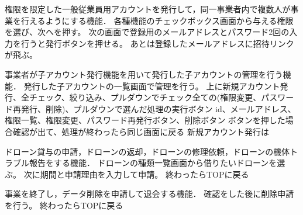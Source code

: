 \documentclass[a4paper, titlepage]{jsarticle}
\begin{document}
\begin{description}[labelwidth=\linewidth]
  \item [子アカウント発行機能] 権限を限定した一般従業員用アカウントを発行して，同一事業者内で複数人が事業を行えるようにする機能．
  各種機能のチェックボックス画面から与える権限を選び、次へを押す。
  次の画面で登録用のメールアドレスとパスワード2回の入力を行うと発行ボタンを押せる。
  あとは登録したメールアドレスに招待リンクが飛ぶ。

  \item [子アカウント管理機能] 事業者が子アカウント発行機能を用いて発行した子アカウントの管理を行う機能．
  発行した子アカウントの一覧画面で管理を行う。
  上に新規アカウント発行、全チェック、絞り込み、プルダウンでチェック全ての(権限変更、パスワード再発行、削除)、プルダウンで選んだ処理の実行ボタン
  id、メールアドレス、権限一覧、権限変更、パスワード再発行ボタン、削除ボタン
  ボタンを押した場合確認が出て、処理が終わったら同じ画面に戻る
  新規アカウント発行は

  \item [ドローン貸与申請機能] ドローン貸与の申請，ドローンの返却，ドローンの修理依頼，ドローンの機体トラブル報告をする機能．
  ドローンの種類一覧画面から借りたいドローンを選ぶ。
  次に期間と申請理由を入力して申請。
  終わったらTOPに戻る

  \item [退会機能] 事業を終了し，データ削除を申請して退会する機能．
  確認をした後に削除申請を行う。
  終わったらTOPに戻る
\end{description}
\end{document}
